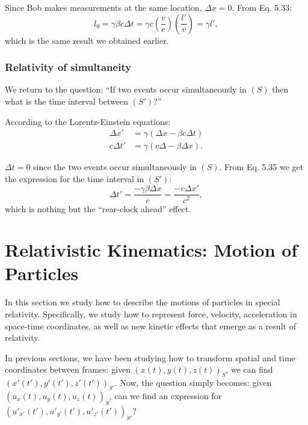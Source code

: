 \documentclass[a4paper,11pt]{article}
\numberwithin{equation}{section}
\begin{document}
 \noindent Since Bob makes measurements at the same location, $\Delta x = 0$. From Eq. 5.33:
 \begin{equation}
 l_0 = \gamma \beta c \Delta t = \gamma c \left( \frac{v}{c}\right) \left( \frac{l'}{v}\right)  = \gamma l',
 \end{equation}
 which is the same result we obtained earlier. 
 
 \subsubsection{Relativity of simultaneity}
 We return to the question: ``If two events occur simultaneously in $(S)$ then what is the time interval between $(S')$?''
 
 \noindent According to the Lorentz-Einstein equations:
 \begin{equation}
 \begin{split}
 \Delta x' &= \gamma(\Delta x - \beta c \Delta t)\\
 c\Delta t' &= \gamma(c\Delta - \beta\Delta x ).
 \end{split}
 \end{equation}
 
 \noindent $\Delta t = 0$ since the two events occur simultaneously in $(S)$. From Eq. 5.35 we get the expression for the time interval in $(S')$:
 \begin{equation}
 \Delta t' = \frac{-\gamma\beta\Delta x}{c}=\frac{-v\Delta x'}{c^2},
 \end{equation}
 which is nothing but the ``rear-clock ahead'' effect.
 
 \newpage
 
 \section{Relativistic Kinematics: Motion of Particles}
 In this section we study how to describe the motions of particles in special relativity. Specifically, we study how to represent force, velocity, acceleration in space-time coordinates, as well as new kinetic effects that emerge as a result of relativity. 
 
 \noindent In previous sections, we have been studying how to transform spatial and time coordinates between frames: given $\left( x(t),y(t),z(t)\right) _S$, we can find $\left( x'(t'),y'(t'),z'(t')\right) _{S'}$. Now, the question simply becomes: given $\left(u_x(t),u_y(t), u_z(t) \right) _S$, can we find an expression for $\left( {u'}_{x'}(t'),{u'}_{y'}(t'),{u'}_{z'}(t')\right)_{S'}$? 
 
\end{document}
